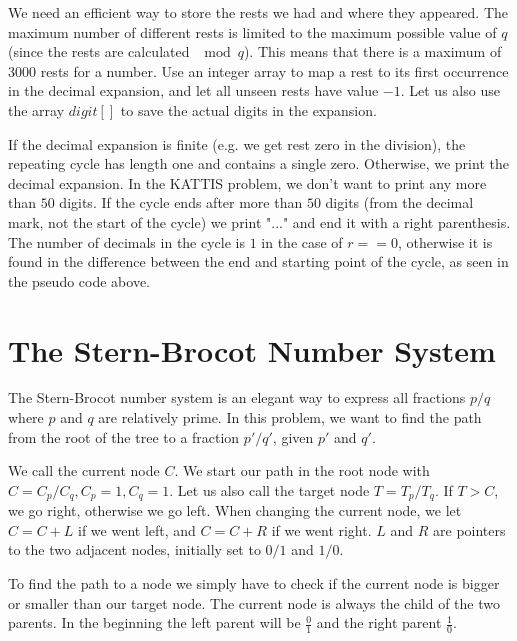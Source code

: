 \documentclass[11pt,a4paper,twoside]{article}
\begin{document}
We need an efficient way to store the rests we had and where they appeared. The
maximum number of different rests is limited to the maximum possible value of
$q$ (since the rests are calculated $\mod q$). This means that there is a
maximum of $3000$ rests for a number. Use an integer array to map a rest to its
first occurrence in the decimal expansion, and let all unseen rests have value
$-1$.  Let us also use the array $digit[]$ to save the actual digits in the
expansion.

       
If the decimal expansion is finite (e.g. we get rest zero in the division), the
repeating cycle has length one and contains a single zero. Otherwise, we print
the decimal expansion. In the KATTIS problem, we don't want to print any more
than $50$ digits. If the cycle ends after more than $50$ digits (from the
decimal mark, not the start of the cycle) we print "..." and end it with a
right parenthesis. The number of decimals in the cycle is $1$ in the case of
$r==0$, otherwise it is found in the difference between the end and starting
point of the cycle, as seen in the pseudo code above.

\section{The Stern-Brocot Number System}

The Stern-Brocot number system is an elegant way to express all fractions $p/q$ where $p$ and $q$ are relatively prime. In this problem, we want to find the path from the root of the tree to a fraction $p'/q'$, given $p'$ and $q'$. 

We call the current node $C$. We start our path in the root node with $C = C_{p}/C_{q}, C_{p} = 1, C_{q} = 1$. Let us also call the target node $T = T_{p}/T_{q}$. If $T > C$, we go right, otherwise we go left. When changing the current node, we let $C = C + L$ if we went left, and $C = C + R$ if we went right. $L$ and $R$ are pointers to the two adjacent nodes, initially set to $0/1$ and $1/0$.


To find the path to a node we simply have to check if the current node is
bigger or smaller than our target node. The current node is always the child of
the two parents. In the beginning the left parent will be $\frac{0}{1}$ and the
right parent $\frac{1}{0}$.
\end{document}
